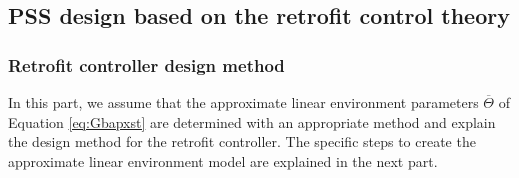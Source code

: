 \documentclass[tombow,dvipdfmx]{corona-a5-1.1}
\begin{document}
\subsection{PSS design based on the retrofit control theory\advanced}\label{sec:designret}

\smallskip
\subsubsection{Retrofit controller design method}

In this part, we assume that the approximate linear environment parameters $\overline{\mathit{\Theta}}$ of Equation \ref{eq:Gbapxst} are determined with an appropriate method and explain the design method for the retrofit controller.
The specific steps to create the approximate linear environment model are explained in the next part.
\end{document}
